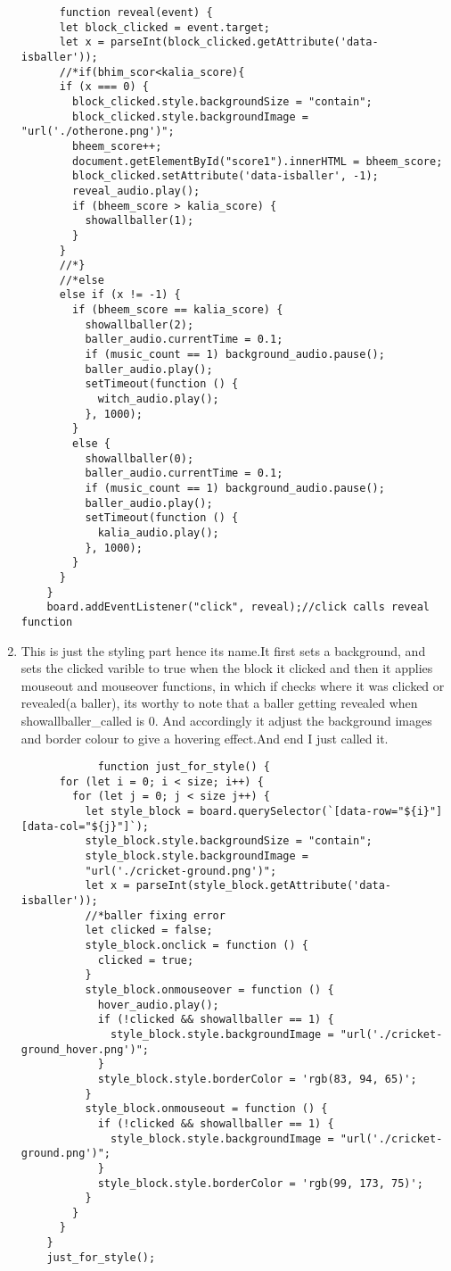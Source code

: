 \documentclass{article}
\begin{document}
\begin{flushleft}
\begin{enumerate}
    \begin{verbatim}
      function reveal(event) {
      let block_clicked = event.target;
      let x = parseInt(block_clicked.getAttribute('data-isballer'));
      //*if(bhim_scor<kalia_score){
      if (x === 0) {
        block_clicked.style.backgroundSize = "contain";
        block_clicked.style.backgroundImage = "url('./otherone.png')";
        bheem_score++;
        document.getElementById("score1").innerHTML = bheem_score;
        block_clicked.setAttribute('data-isballer', -1);
        reveal_audio.play();
        if (bheem_score > kalia_score) {
          showallballer(1);
        }
      }
      //*}
      //*else
      else if (x != -1) {
        if (bheem_score == kalia_score) {
          showallballer(2);
          baller_audio.currentTime = 0.1;
          if (music_count == 1) background_audio.pause();
          baller_audio.play();
          setTimeout(function () {
            witch_audio.play();
          }, 1000);
        }
        else {
          showallballer(0);
          baller_audio.currentTime = 0.1;
          if (music_count == 1) background_audio.pause();
          baller_audio.play();
          setTimeout(function () {
            kalia_audio.play();
          }, 1000);
        }
      }
    }
    board.addEventListener("click", reveal);//click calls reveal function
    \end{verbatim}
    \item 
    This is just the styling part hence its name.It first sets a background,
    and sets the clicked varible to true when the block it clicked and then it applies mouseout and mouseover functions, in which if checks where it was clicked or revealed(a baller), its worthy to note that a baller getting revealed when showallballer\_called is 0. And accordingly it adjust the background images and border colour to give a hovering effect.And end I just called it.
    \begin{verbatim}
            function just_for_style() {
      for (let i = 0; i < size; i++) {
        for (let j = 0; j < size j++) {
          let style_block = board.querySelector(`[data-row="${i}"][data-col="${j}"]`);
          style_block.style.backgroundSize = "contain";
          style_block.style.backgroundImage = 
          "url('./cricket-ground.png')";
          let x = parseInt(style_block.getAttribute('data-isballer'));
          //*baller fixing error
          let clicked = false;
          style_block.onclick = function () {
            clicked = true;
          }
          style_block.onmouseover = function () {
            hover_audio.play();
            if (!clicked && showallballer == 1) {
              style_block.style.backgroundImage = "url('./cricket-ground_hover.png')";
            }
            style_block.style.borderColor = 'rgb(83, 94, 65)';
          }
          style_block.onmouseout = function () {
            if (!clicked && showallballer == 1) {
              style_block.style.backgroundImage = "url('./cricket-ground.png')";
            }
            style_block.style.borderColor = 'rgb(99, 173, 75)';
          }
        }
      }
    }
    just_for_style();
    \end{verbatim}
    \end{enumerate}

\end{flushleft}
\end{document}
